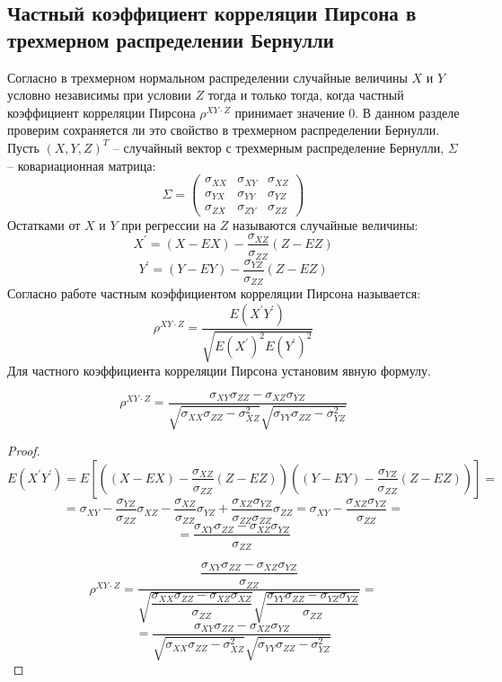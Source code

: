 \subsection{Частный коэффициент корреляции Пирсона в трехмерном распределении Бернулли}\label{partial_section}
Согласно \cite{Anderson2003} в трехмерном нормальном распределении случайные величины 
$X$ и $Y$ условно независимы при условии $Z$ тогда и только тогда, когда частный коэффициент корреляции Пирсона
$\rho^{XY \cdot Z}$ принимает значение $0$.
В данном разделе проверим сохраняется ли это свойство в трехмерном распределении Бернулли.
Пусть $(X,Y,Z)^T$ -- случайный вектор с трехмерным распределение Бернулли,
$\Sigma$ -- ковариационная матрица:
$$\Sigma =
    \begin{pmatrix}
        \sigma_{XX} & \sigma_{XY} & \sigma_{XZ} \\
        \sigma_{YX} & \sigma_{YY} & \sigma_{YZ} \\
        \sigma_{ZX} & \sigma_{ZY} & \sigma_{ZZ}
    \end{pmatrix}
$$
Остатками от $X$ и $Y$ при регрессии на $Z$ называются случайные величины:
$$
X^{\prime}=(X-EX)-\dfrac{\sigma_{XZ}}{\sigma_{ZZ}}(Z-EZ)
$$
$$
Y^{\prime}=(Y-EY)-\dfrac{\sigma_{YZ}}{\sigma_{ZZ}}(Z-EZ)
$$
Согласно работе \cite{Cramér1946} частным коэффициентом корреляции Пирсона называется:
$$
\rho^{XY \cdot Z}=\dfrac{E(X^{\prime} Y^{\prime})}{\sqrt{E(X^{\prime})^2 E(Y^{\prime})^2}}
$$
Для частного коэффициента корреляции Пирсона установим явную формулу.
\begin{lemma}\label{partial_formula1}
    $$
    \rho^{XY \cdot Z}=\dfrac{\sigma_{XY} \sigma_{ZZ} - \sigma_{XZ} \sigma_{YZ}}{\sqrt{\sigma_{XX}\sigma_{ZZ}-
    \sigma_{XZ}^2}\sqrt{\sigma_{YY}\sigma_{ZZ}-\sigma_{YZ}^2}}
    $$
\end{lemma}
\begin{proof}
    $$E(X^\prime Y^\prime)=E[((X-EX)-\dfrac{\sigma_{XZ}}{\sigma_{ZZ}}(Z-EZ))((Y-EY)-\dfrac{\sigma_{YZ}}{\sigma_{ZZ}}(Z-EZ))]=$$
    $$=\sigma_{XY}-\dfrac{\sigma_{YZ}}{\sigma_{ZZ}}\sigma_{XZ}-\dfrac{\sigma_{XZ}}{\sigma_{ZZ}}\sigma_{YZ}+
    \dfrac{\sigma_{XZ}\sigma_{YZ}}{\sigma_{ZZ}\sigma_{ZZ}}\sigma_{ZZ}=\sigma_{XY}-\dfrac{\sigma_{XZ} \sigma_{YZ}}{ \sigma_{ZZ}}=
    $$
    $$
    =\dfrac{\sigma_{XY}\sigma_{ZZ}-\sigma_{XZ}\sigma_{YZ}}{\sigma_{ZZ}}$$

    $$
    \rho^{XY \cdot Z}=\dfrac{\dfrac{\sigma_{XY}\sigma_{ZZ}-\sigma_{XZ}\sigma_{YZ}}{\sigma_{ZZ}}}
    {\sqrt{
        \dfrac{\sigma_{XX}\sigma_{ZZ}-\sigma_{XZ}\sigma_{XZ}}{\sigma_{ZZ}}
    }\sqrt{
        \dfrac{\sigma_{YY}\sigma_{ZZ}-\sigma_{YZ}\sigma_{YZ}}{\sigma_{ZZ}}
    }}=
    $$
    $$
    =\dfrac{\sigma_{XY} \sigma_{ZZ} - \sigma_{XZ} \sigma_{YZ}}{\sqrt{\sigma_{XX}\sigma_{ZZ}-
    \sigma_{XZ}^2}\sqrt{\sigma_{YY}\sigma_{ZZ}-\sigma_{YZ}^2}}
    $$
\end{proof}

